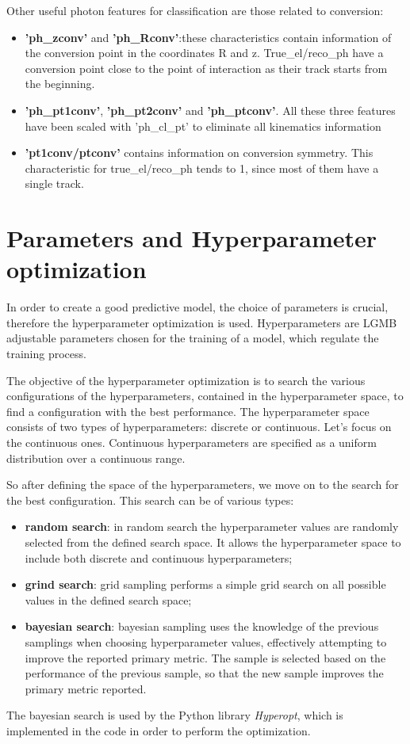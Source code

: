 				Other useful photon features for classification are those related to conversion:
				\begin{itemize}
					\item \textbf{'ph\_zconv'} and \textbf{'ph\_Rconv'}:these characteristics contain information of the conversion point in the coordinates R and z. True\_el/reco\_ph have a conversion point close to the point of interaction as their track starts from the beginning.
					\item \textbf{'ph\_pt1conv'}, \textbf{'ph\_pt2conv'} and \textbf{'ph\_ptconv'}. All these three features have been scaled with 'ph\_cl\_pt' to eliminate all kinematics information 
					\item \textbf{'pt1conv/ptconv'} contains information on conversion symmetry. This characteristic for true\_el/reco\_ph tends to 1, since most of them have a single track.
				\end{itemize}
				
			\section{Parameters and Hyperparameter optimization}	
			In order to create a good predictive model, the choice of parameters is crucial, therefore the hyperparameter optimization is used. Hyperparameters are LGMB adjustable parameters chosen for the training of a model, which regulate the training process. 
			
			The objective of the hyperparameter optimization is to search the various configurations of the hyperparameters, contained in the hyperparameter space, to find a configuration with the best performance. The hyperparameter space consists of two types of hyperparameters: discrete or continuous. Let's focus on the continuous ones.
			Continuous hyperparameters are specified as a uniform distribution   over a continuous range. 
			
			So after defining the space of the hyperparameters, we move on to the search for the best configuration. This search can be of various types:
			\begin{itemize}
				\item \textbf{random search}: in random search the hyperparameter values are randomly selected from the defined search space. It allows the  hyperparameter space to include both discrete and continuous hyperparameters;
				\item \textbf{grind search}: grid sampling performs a simple grid search on all possible values in the defined search space;
				\item \textbf{bayesian search}: bayesian sampling uses the knowledge of the previous samplings when choosing hyperparameter values, effectively attempting to improve the reported primary metric. The sample is selected based on the performance of the previous sample, so that the new sample improves the primary metric reported. 
			\end{itemize}
			The bayesian search is used by the Python library \textit{Hyperopt}, which is implemented in the code in order to perform the optimization.
			
